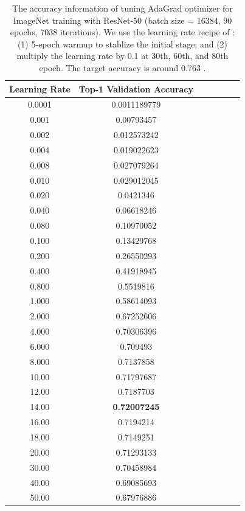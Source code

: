 \begin{table}[ht]
\renewcommand{\arraystretch}{1.3}
\caption{The accuracy information of tuning AdaGrad optimizer for ImageNet training with ResNet-50 (batch size = 16384, 90 epochs, 7038 iterations). We use the learning rate recipe of \citep{goyal2017accurate}: (1) 5-epoch warmup to stablize the initial stage; and (2) multiply the learning rate by 0.1 at 30th, 60th, and 80th epoch. The target accuracy is around 0.763 \citep{goyal2017accurate}.}
\centering
\begin{tabular}{|c|c|c|c|c|c|c|}
\hline
Learning Rate & Top-1 Validation Accuracy \\
\hline
\hline
0.0001 & 0.0011189779 \\
\hline
0.001 & 0.00793457 \\
\hline
0.002 & 0.012573242 \\
\hline
0.004 & 0.019022623 \\
\hline
0.008 & 0.027079264 \\
\hline
0.010 & 0.029012045 \\
\hline
0.020 & 0.0421346 \\
\hline
0.040 & 0.06618246 \\
\hline
0.080 & 0.10970052 \\
\hline
0.100 & 0.13429768 \\
\hline
0.200 & 0.26550293 \\
\hline
0.400 & 0.41918945 \\
\hline
0.800 & 0.5519816 \\
\hline
1.000 & 0.58614093 \\
\hline
2.000 & 0.67252606 \\
\hline
4.000 & 0.70306396 \\
\hline
6.000 & 0.709493 \\
\hline
8.000 & 0.7137858 \\
\hline
10.00 & 0.71797687 \\
\hline
12.00 & 0.7187703 \\
\hline
14.00 & {\bf 0.72007245} \\
\hline
16.00 & 0.7194214 \\
\hline
18.00 & 0.7149251 \\
\hline
20.00 & 0.71293133 \\
\hline
30.00 & 0.70458984 \\
\hline
40.00 & 0.69085693 \\
\hline
50.00 & 0.67976886 \\
\hline
\end{tabular}
\label{table:imagenet_adagrad_tuning_2}
\end{table}

